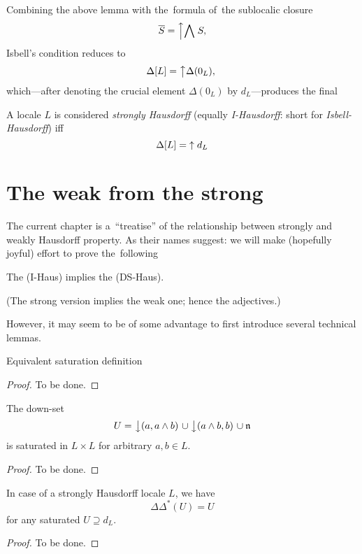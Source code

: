 Combining the above lemma with the~formula of~the sublocalic closure
\[
  \overline{S} = \left\uparrow \bigwedge \right. S,
\]
Isbell's condition reduces to
\[
  \Delta[L] = \left\uparrow \Delta(0_L),\right.
\]
which---after denoting the crucial element $\Delta(0_L)$ by $d_L$---produces
the final

\begin{framed}
  \begin{df}[I-Haus]
    A locale $L$ is considered \emph{strongly Hausdorff\/} (equally
    \emph{I-Hausdorff}: short for \emph{Isbell-Hausdorff}) iff
    \[
      \Delta[L] = \left\uparrow\right. d_L
    \]
  \end{df}
\end{framed}

\section{The weak from the strong}

The current chapter is a~``treatise'' of the relationship between strongly and
weakly Hausdorff property.
As their names suggest: we will make (hopefully joyful) effort to prove
the~following

\begin{thm} \label{IHaus->DSHaus}
  The (I-Haus) implies the (DS-Haus).
\end{thm}
(The strong version implies the weak one; hence the adjectives.)

However, it may seem to be of some advantage to first introduce several
technical lemmas.

\begin{lem} \label{satur-def-eq}
  Equivalent saturation definition
\end{lem}
\begin{proof}
  To be done.
\end{proof}

\begin{lem} \label{downsets-satur}
  The down-set
  \[
    U = \left\downarrow(a, a \wedge b)\right. \cup \left\downarrow(a \wedge b, b)\right. \cup \mathfrak{n}
  \]
  is saturated in $L \times L$ for arbitrary $a, b\in L$.
\end{lem}
\begin{proof}
  To be done.
\end{proof}

\begin{lem} \label{meets-in-satur}
  In case of a strongly Hausdorff locale $L$, we have
  \[
    \Delta \Delta^*(U) = U
  \]
  for any saturated $U \supseteq d_L$.
\end{lem}
\begin{proof}
  To be done.
\end{proof}

